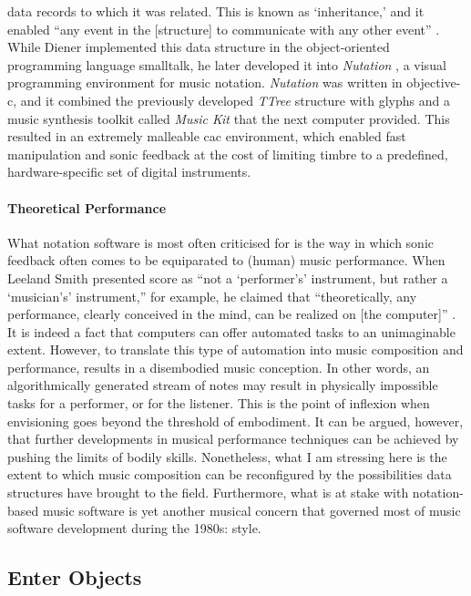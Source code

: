 data records to which it was related. This is known as `inheritance,' and it enabled ``any event in the [structure] to communicate with any other event'' \parencite[188]{icmc/bbp2372.1988.020}. While Diener implemented this data structure in the object-oriented programming language \gls{smalltalk}, he later developed it into \textit{Nutation} \parencite{DBLP:conf/icmc/Diener92}, a visual programming environment for music notation. \textit{Nutation} was written in \gls{objective-c}, and it combined the previously developed \textit{TTree} structure with glyphs and a music synthesis toolkit called \textit{Music Kit} that the \gls{next} computer provided. This resulted in an extremely malleable \gls{cac} environment, which enabled fast manipulation and sonic feedback at the cost of limiting timbre to a predefined, hardware-specific set of digital instruments. 

\paragraph{Theoretical Performance}
What notation software is most often criticised for is the way in which sonic feedback often comes to be equiparated to (human) music performance. When Leeland Smith presented \gls{score} as ``not a `performer's' instrument, but rather a `musician's' instrument,'' for example, he claimed that ``theoretically, any performance, clearly conceived in the mind, can be realized on [the computer]'' \parencite[14]{smith1971}. It is indeed a fact that computers can offer automated tasks to an unimaginable extent. However, to translate this type of automation into music composition and performance, results in a disembodied music conception. In other words, an algorithmically generated stream of notes may result in physically impossible tasks for a performer, or for the listener. This is the point of inflexion when envisioning goes beyond the threshold of embodiment. It can be argued, however, that further developments in musical performance techniques can be achieved by pushing the limits of bodily skills. Nonetheless, what I am stressing here is the extent to which music composition can be reconfigured by the possibilities data structures have brought to the field. Furthermore, what is at stake with notation-based music software is yet another musical concern that governed most of music software development during the 1980s: style.

\subsection{Enter Objects}

